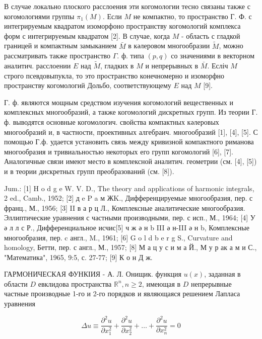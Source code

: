 \documentclass[10pt]{article}
\begin{document}
В случае локально плоского расслоения эти когомологии тесно связаны также с когомологиями группы $\pi_{1}(M)$. Если $M$ не компактно, то пространство Г. Ф. с интегрируемым квадратом изоморфоно пространству когомологий комплекса форм с интегрируемым квадратом [2]. В случае, когда $M$ - область с гладкой границей и компактным замыканием $\bar{M}$ в кәлеровом многообразии $\tilde{M}$, можно рассматривать также пространство $\Gamma$. ф. типа $(p, q)$ со значениями в векторном аналитич. расслоении $E$ над $\tilde{M}$, гладких в $M$ и непрерывных в $\bar{M}$. Есліч $M$ строго псевдовыпукла, то это пространство конечномерно и изоморфно пространству когомологий Дольбо, соответствующему $E$ над $M$ [9].



Г. ф. являются мощным средством изучения когомологий вещественных и комплексных многообразий, а также когомологий дискретных групп. Из теории Г. ф. выводятся основные когомологич. свойства компактных кәлеровых многообразий и, в частности, проективных алгебраич. многообразий [1], [4], [5]. С помощью Г.ф. удается установить связь между кривизной компактного риманова многообразия и тривиальностью некоторых его групп когомологий [6], [7]. Аналогичные связи имеют место в комплексной аналитич. геометрии (см. [4], [5]) и в теории дискретных групп преобразований (см. [8]).



Jum.: [1] $\mathrm{H}$ o d g e W. V. D., The theory and applications of harmonic integrals, 2 ed., Camb., 1952; [2] д e P a м ЖK., Дифференцируемые многообразия, пер. с франц., М., 1956; [3] II в а р ц Л., Комплексные аналитические многообразия. Эллиптические уравнения с частными производными, пер. с исп., М., 1964; [4] У ә л л с Р., Дифференциальное исчис[5] ч ж ә н b III ә н-III ә н b, Комплексные многообразия, пер. c англ., M., 1961; [6] G o l d b e r g S., Curvature and homology, Бетти, пер. с англ., М., 1957; [8] М а ц у с и м а Й., М у р ак а м и С., "Математика", 1965, 9:5, с. 27-77; [9] К о н Д ж.



ГАРМОНИЧЕСКАЯ ФУНКІИЯ - А. Л. Онищик. функция $u(x)$, заданная в области $D$ евклидова пространства $\mathbb{R}^{n}, n \geqslant 2$, имеющая в $D$ непрерывные частные производные 1-го и 2-го порядков и являющаяся решением Лапласа уравнения



\[

\Delta u \equiv \frac{\partial^{2} u}{\partial x_{1}^{2}}+\frac{\partial^{2} u}{\partial x_{2}^{2}}+\ldots+\frac{\partial^{2} u}{\partial x_{n}^{2}}=0

\]
\end{document}
